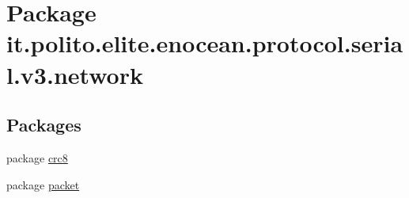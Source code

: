 \hypertarget{namespaceit_1_1polito_1_1elite_1_1enocean_1_1protocol_1_1serial_1_1v3_1_1network}{}\section{Package it.\+polito.\+elite.\+enocean.\+protocol.\+serial.\+v3.\+network}
\label{namespaceit_1_1polito_1_1elite_1_1enocean_1_1protocol_1_1serial_1_1v3_1_1network}
\subsection*{Packages}
\begin{DoxyCompactItemize}
\item 
package \hyperlink{namespaceit_1_1polito_1_1elite_1_1enocean_1_1protocol_1_1serial_1_1v3_1_1network_1_1crc8}{crc8}
\item 
package \hyperlink{namespaceit_1_1polito_1_1elite_1_1enocean_1_1protocol_1_1serial_1_1v3_1_1network_1_1packet}{packet}
\end{DoxyCompactItemize}
